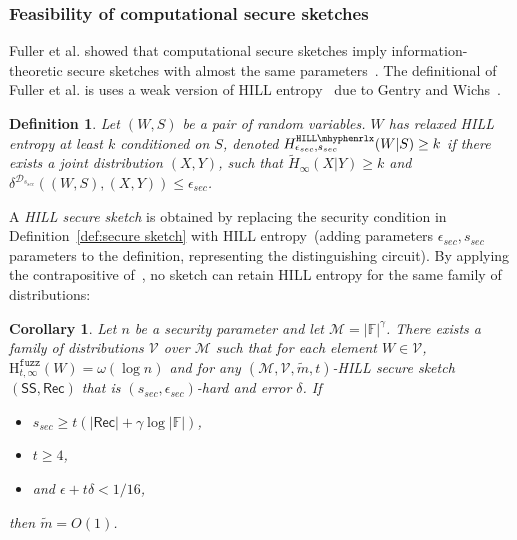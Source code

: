 \documentclass[11pt]{article}
\newcommand{\defref}[1]{\mbox{Definition~\ref{#1}}}
\newcommand{\class}[1]{{\ensuremath{\mathsf{#1}}}}
\newcommand{\sketch}{\ensuremath{\class{SS}}\xspace}
\newcommand{\rec}{\ensuremath{\class{Rec}}\xspace}
\newcommand{\hillrlx}{\ensuremath{\mathtt{HILL\mhyphen rlx}}\xspace}
\newcommand{\Hfuzz}{\mathrm{H}^{\mathtt{fuzz}}_{t,\infty}}
\newtheorem{corollary}[theorem]{Corollary}
\newtheorem{definition}[theorem]{Definition}
\begin{document}
\subsubsection{Feasibility of computational secure sketches}
\label{sec:feas comp sec sketch}
Fuller et al. showed that computational secure sketches imply information-theoretic secure sketches with almost the same parameters~\cite[Corollary 3.8]{fuller2013computational}.  %
The definitional of Fuller et al. is uses a weak version of HILL entropy~\cite{DBLP:journals/siamcomp/HastadILL99} due to Gentry and Wichs~\cite{gentry2011separating}.

\begin{definition}
\label{def:relaxed hill}
Let $(W, S)$ be a pair of random variables.  $W$ has 
\emph{relaxed HILL entropy} at least $k$ conditioned on $S$,
denoted $H^{\hillrlx}_{\epsilon_{sec}, s_{sec}}(W|S)\geq k$ if there exists a joint distribution $(X, Y)$, such that $\tilde{H}_\infty(X|Y)\geq k$ and $\delta^{\mathcal{D}_{s_{sec}}} ((W, S),(X,Y))\leq \epsilon_{sec}$.
\end{definition}

A \emph{HILL secure sketch} is obtained by replacing the security condition in \defref{def:secure sketch} with HILL entropy~(adding parameters $\epsilon_{sec}, s_{sec}$ parameters to the definition, representing the distinguishing circuit).  By applying the contrapositive of~\cite[Corollary 3.8]{fuller2013computational}, no sketch can retain HILL entropy for the same family of distributions:

\begin{corollary}
\label{cor:imposs comp sketch}
Let $n$ be a security parameter and let $\mathcal{M} = |\mathbb{F}|^\gamma$.  There exists a family of distributions $\mathcal{V}$ over $\mathcal{M}$ such that for each element $W\in \mathcal{V}$, $\Hfuzz(W)= \omega(\log n)$ and for any $(\mathcal{M}, \mathcal{V}, \tilde{m}, t)$-HILL secure sketch $(\sketch, \rec)$ that is $(s_{sec}, \epsilon_{sec})$-hard and error $\delta$.  If 
\begin{itemize}
\item $s_{sec}\ge t(|\rec| + \gamma \log |\mathbb{F}|)$, 
\item $t\ge 4$,
\item and $\epsilon + t\delta < 1/16$,
\end{itemize}
 then $\tilde{m} =O(1)$.
\end{corollary}
\end{document}
